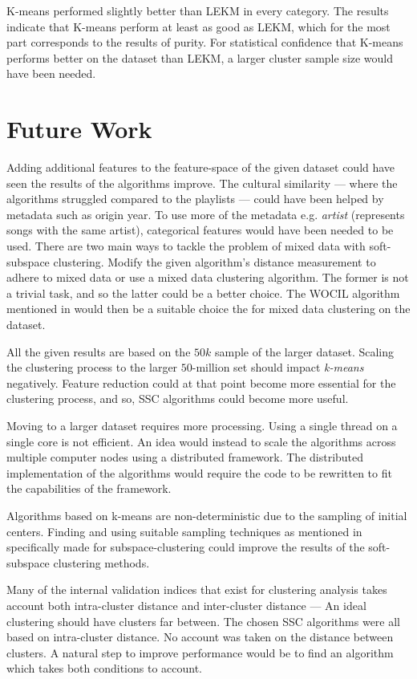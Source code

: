 \documentclass[../report.tex]{subfiles}
\begin{document}
K-means performed slightly better than LEKM in every category. The results indicate that K-means perform at least as good as LEKM, which for the most part corresponds to the results of purity. For statistical confidence that K-means performs better on the dataset than LEKM, a larger cluster sample size would have been needed.


\section{Future Work}
Adding additional features to the feature-space of the given dataset could have seen the results of the algorithms improve. The cultural similarity --- where the algorithms struggled compared to the playlists --- could have been helped by metadata such as origin year. To use more of the metadata e.g. \textit{artist} (represents songs with the same artist), categorical features would have been needed to be used. There are two main ways to tackle the problem of mixed data with soft-subspace clustering. Modify the given algorithm's distance measurement to adhere to mixed data or use a mixed data clustering algorithm. The former is not a trivial task, and so the latter could be a better choice. The WOCIL algorithm mentioned in \cite{Jia2018} would then be a suitable choice the for mixed data clustering on the dataset.

All the given results are based on the $50k$ sample of the larger dataset. Scaling the clustering process to the larger $50$-million set should impact \textit{k-means} negatively. Feature reduction could at that point become more essential for the clustering process, and so, SSC algorithms could become more useful.

Moving to a larger dataset requires more processing. Using a single thread on a single core is not efficient. An idea would instead to scale the algorithms across multiple computer nodes using a distributed framework. The distributed implementation of the algorithms would require the code to be rewritten to fit the capabilities of the framework.

Algorithms based on k-means are non-deterministic due to the sampling of initial centers. Finding and using suitable sampling techniques as mentioned in \cite{Gan2016} specifically made for subspace-clustering could improve the results of the soft-subspace clustering methods.

Many of the internal validation indices that exist for clustering analysis takes account both intra-cluster distance and inter-cluster distance --- An ideal clustering should have clusters far between. The chosen SSC algorithms were all based on intra-cluster distance. No account was taken on the distance between clusters. A natural step to improve performance would be to find an algorithm which takes both conditions to account.
\end{document}
